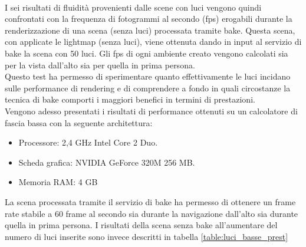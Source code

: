 \\
I sei risultati di fluidità provenienti dalle scene con luci vengono quindi confrontati con la frequenza di fotogrammi al secondo (fps) erogabili durante la renderizzazione di una scena (senza luci) processata tramite bake. Questa scena, con applicate le lightmap (senza luci), viene ottenuta dando in input al servizio di bake la scena con 50 luci.
Gli fps di ogni ambiente creato vengono calcolati sia per la vista dall’alto sia per quella in prima persona.
\\
Questo test ha permesso di sperimentare quanto effettivamente le luci incidano sulle performance di rendering e di comprendere a fondo in quali circostanze la tecnica di bake comporti i maggiori benefici in termini di prestazioni.
\\
Vengono adesso presentati i risultati di performance ottenuti su un calcolatore di fascia bassa con la seguente architettura:
\begin{itemize}
\item Processore: 2,4 GHz Intel Core 2 Duo.
\item Scheda grafica: NVIDIA GeForce 320M 256 MB.
\item Memoria RAM: 4 GB
\end{itemize}

La scena processata tramite il servizio di bake ha permesso di ottenere un frame rate stabile a 60 frame al secondo sia durante la navigazione dall'alto sia durante quella in prima persona.
I risultati della scena senza bake all'aumentare del numero di luci inserite sono invece descritti in tabella \ref{table:luci_basse_prest}

